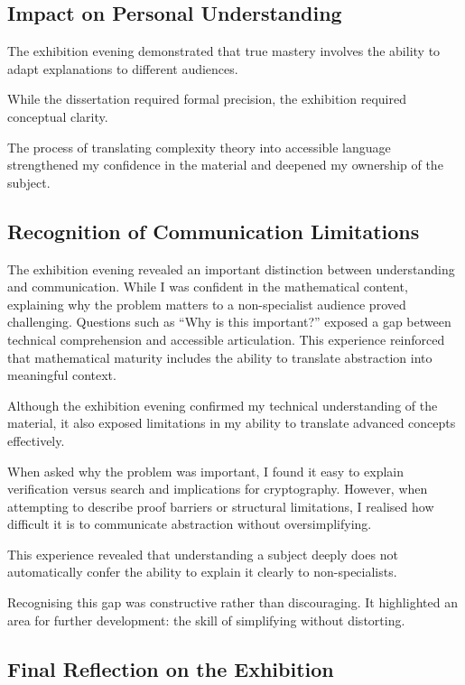 \documentclass[12pt]{article}
\begin{document}
\subsection*{Impact on Personal Understanding}

The exhibition evening demonstrated that true mastery involves the ability to adapt explanations to different audiences.

While the dissertation required formal precision, the exhibition required conceptual clarity.

The process of translating complexity theory into accessible language strengthened my confidence in the material and deepened my ownership of the subject.

\subsection*{Recognition of Communication Limitations}

The exhibition evening revealed an important distinction between understanding and communication.
While I was confident in the mathematical content, explaining why the problem matters to a non-specialist audience proved challenging.
Questions such as “Why is this important?” exposed a gap between technical comprehension and accessible articulation.
This experience reinforced that mathematical maturity includes the ability to translate abstraction into meaningful context.

Although the exhibition evening confirmed my technical understanding of the material, it also exposed limitations in my ability to translate advanced concepts effectively.

When asked why the problem was important, I found it easy to explain verification versus search and implications for cryptography.
However, when attempting to describe proof barriers or structural limitations, I realised how difficult it is to communicate abstraction without oversimplifying.

This experience revealed that understanding a subject deeply does not automatically confer the ability to explain it clearly to non-specialists.

Recognising this gap was constructive rather than discouraging. It highlighted an area for further development: the skill of simplifying without distorting.

\subsection*{Final Reflection on the Exhibition}
\end{document}
